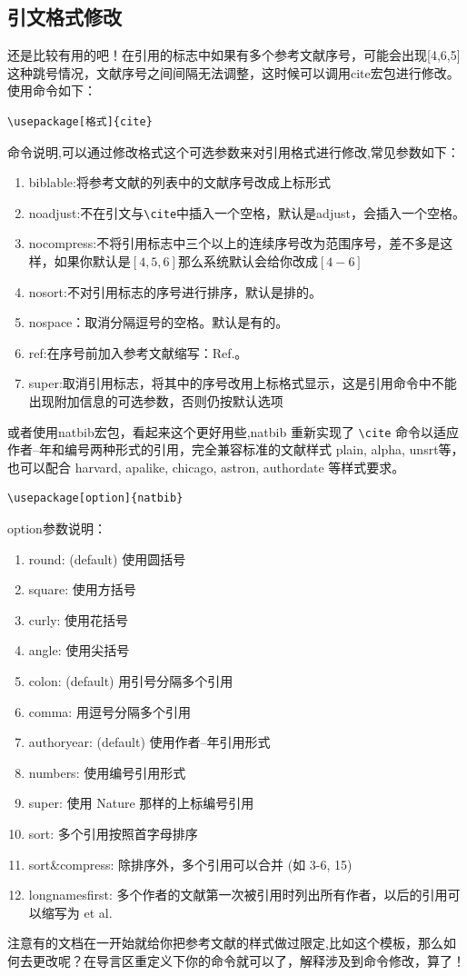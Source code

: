 \documentclass[cn,chinese,color=cyan]{elegantbook}
\begin{document}
\subsection{引文格式修改}
还是比较有用的吧！在引用的标志中如果有多个参考文献序号，可能会出现[4,6,5]这种跳号情况，文献序号之间间隔无法调整，这时候可以调用cite宏包进行修改。使用命令如下：
\begin{lstlisting}[style=R]
\usepackage[格式]{cite}
\end{lstlisting}
命令说明,可以通过修改格式这个可选参数来对引用格式进行修改,常见参数如下：
\begin{enumerate}
	\item biblable:将参考文献的列表中的文献序号改成上标形式
	\item noadjust:不在引文与\verb|\cite|中插入一个空格，默认是adjust，会插入一个空格。
	\item nocompress:不将引用标志中三个以上的连续序号改为范围序号，差不多是这样，如果你默认是$[4,5,6]$那么系统默认会给你改成$[4-6]$
	\item nosort:不对引用标志的序号进行排序，默认是排的。
	\item nospace：取消分隔逗号的空格。默认是有的。
	\item ref:在序号前加入参考文献缩写：Ref.。
	\item super:取消引用标志，将其中的序号改用上标格式显示，这是引用命令中不能出现附加信息的可选参数，否则仍按默认选项
\end{enumerate}

或者使用natbib宏包，看起来这个更好用些,natbib 重新实现了 \verb|\cite| 命令以适应作者--年和编号两种形式的引用，完全兼容标准的文献样式 plain, alpha, unsrt等，也可以配合 harvard, apalike, chicago, astron, authordate 等样式要求。
\begin{lstlisting}[style=R]
\usepackage[option]{natbib}
\end{lstlisting}
option参数说明：
\begin{enumerate}
	\item round: (default) 使用圆括号
	\item square: 使用方括号
	\item curly: 使用花括号
	\item angle: 使用尖括号
	\item colon: (default) 用引号分隔多个引用
	\item comma: 用逗号分隔多个引用
	\item authoryear: (default) 使用作者--年引用形式
	\item numbers: 使用编号引用形式
	\item super: 使用 Nature 那样的上标编号引用
	\item sort: 多个引用按照首字母排序
	\item sort\&compress: 除排序外，多个引用可以合并 (如 3-6, 15)
	\item longnamesfirst: 多个作者的文献第一次被引用时列出所有作者，以后的引用可以缩写为 et al.
\end{enumerate}
注意有的文档在一开始就给你把参考文献的样式做过限定,比如这个模板，那么如何去更改呢？在导言区重定义下你的命令就可以了，解释涉及到命令修改，算了！
\end{document}
